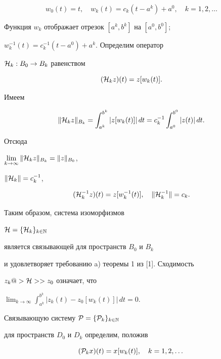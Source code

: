 $$


w_0(t) = t,\quad w_k(t)=c_k(t-a^k)+a^0,


\quad k=1,2,\dotsc


$$


Функция $w_k$ отображает отрезок $[a^k,b^k]$ на $[a^0,b^0]$;


$w^{-1}_k(t) = c^{-1}_k(t-a^0)+a^k$. Определим оператор


${\cal H}_k:B_0\to B_k$ равенством


\begin{equation}


({\cal H}_kz)(t) = z[w_k(t)].


\end{equation}


Имеем


$$


\|{\cal H}_kz\|_{B_k}=\int_{a^k}^{b^k}|z[w_k(t)]|\,dt =


c^{-1}_k\int_{a^0}^{b^0} |z(t)|\,dt.


$$


Отсюда


$\lim\limits_{k\to\infty}\|{\cal H}_kz\|_{B_k} = \|z\|_{B_0}$,


$\|{\cal H}_k\|=c^{-1}_k$,


$$


({\cal H}_k^{-1}z)(t) = z[w^{-1}_k(t)],\quad


\|{\cal H}^{-1}_k\|=c_k.


$$


Таким образом, система изоморфизмов


${\cal H} = \{{\cal H}_k\}_{k\in {\Bbb N}}$


является связывающей для пространств $B_0$ и $B_k$


и удовлетворяет требованию a) теоремы 1 из [1]. Сходимость


$z_k@>{\cal H}>> z_0$ означает, что


$\displaystyle\lim_{k\to\infty}\int_{a^k}^{b^k} |z_k(t)-z_0[w_k(t)]|\,dt=0$.





Связывающую систему ${\cal P} = \{{\cal P}_k\}_{k\in {\Bbb N}}$


для пространств $D_0$ и $D_k$ определим, положив


\begin{equation}


({\cal P}_kx)(t) = x[w_k(t)],\quad \kodi


\end{equation}


